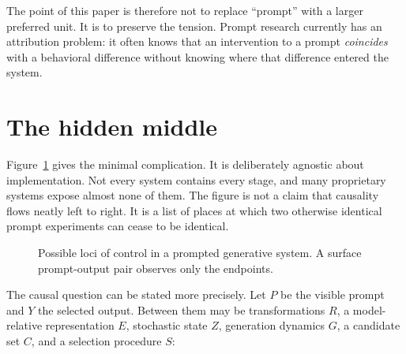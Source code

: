 \documentclass[11pt]{article}
\begin{document}
The point of this paper is therefore not to replace ``prompt'' with a larger preferred unit. It is to preserve the tension. Prompt research currently has an attribution problem: it often knows that an intervention to a prompt \emph{coincides} with a behavioral difference without knowing where that difference entered the system.

\section{The hidden middle}

Figure~\ref{fig:layers} gives the minimal complication. It is deliberately agnostic about implementation. Not every system contains every stage, and many proprietary systems expose almost none of them. The figure is not a claim that causality flows neatly left to right. It is a list of places at which two otherwise identical prompt experiments can cease to be identical.

\begin{figure}[ht]
\centering
{}
\caption{Possible loci of control in a prompted generative system. A surface prompt-output pair observes only the endpoints.}
\label{fig:layers}
\end{figure}

The causal question can be stated more precisely. Let \(P\) be the visible prompt and \(Y\) the selected output. Between them may be transformations \(R\), a model-relative representation \(E\), stochastic state \(Z\), generation dynamics \(G\), a candidate set \(C\), and a selection procedure \(S\):
\end{document}
